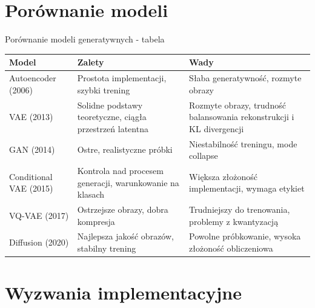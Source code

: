 \documentclass{beamer}
\begin{document}

\section{Porównanie modeli}

\begin{frame}{Porównanie modeli generatywnych - tabela}
  \begin{tabular}{|p{2.5cm}|p{3.5cm}|p{3.5cm}|}
    \hline
    \textbf{Model} & \textbf{Zalety} & \textbf{Wady} \\
    \hline
    Autoencoder (2006) & Prostota implementacji, szybki trening & Słaba generatywność, rozmyte obrazy \\
    \hline
    VAE (2013) & Solidne podstawy teoretyczne, ciągła przestrzeń latentna & Rozmyte obrazy, trudność balansowania rekonstrukcji i KL divergencji \\
    \hline
    GAN (2014) & Ostre, realistyczne próbki & Niestabilność treningu, mode collapse \\
    \hline
    Conditional VAE (2015) & Kontrola nad procesem generacji, warunkowanie na klasach & Większa złożoność implementacji, wymaga etykiet \\
    \hline
    VQ-VAE (2017) & Ostrzejsze obrazy, dobra kompresja & Trudniejszy do trenowania, problemy z kwantyzacją \\
    \hline
    Diffusion (2020) & Najlepsza jakość obrazów, stabilny trening & Powolne próbkowanie, wysoka złożoność obliczeniowa \\
    \hline
  \end{tabular}
\end{frame}


\section{Wyzwania implementacyjne}
\end{document}
